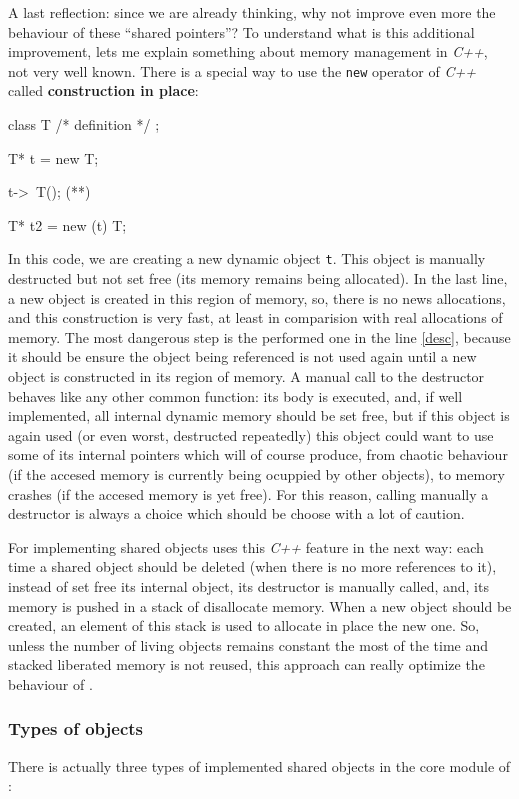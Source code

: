 \documentclass{article}
\begin{document}
A last reflection: since we are already thinking, why not improve even more the
behaviour of these ``shared pointers''? To understand what is this additional
improvement, lets me explain something about memory management in \textit{C++},
not very well known. There is a special way to use the \texttt{new} operator of
\textit{C++} called \textbf{construction in place}:

\begin{Cpp}
  class T { /* definition */ };

  T* t = new T;

  t->~T(); (*\label{desc}*)

  T* t2 = new (t) T;
\end{Cpp}

In this code, we are creating a new dynamic object \texttt{t}. This object is
manually destructed but not set free (its memory remains being allocated). In
the last line, a new object is created in this region of memory, so, there is no
news allocations, and this construction is very fast, at least in comparision
with real allocations of memory. The most dangerous step is the performed one in
the line \ref{desc}, because it should be ensure the object being referenced is
not used again until a new object is constructed in its region of memory. A
manual call to the destructor behaves like any other common function: its
body is executed, and, if well implemented, all internal dynamic memory should
be set free, but if this object is again used (or even worst, destructed
repeatedly) this object could want to use some of its internal pointers which
will of course produce, from chaotic behaviour (if the accesed memory is
currently being ocuppied by other objects), to memory crashes (if the accesed
memory is yet free). For this reason, calling manually a destructor is always a
choice which should be choose with a lot of caution.

For implementing shared objects \fav uses this \textit{C++} feature in the next way:
each time a shared object should be deleted (when there is no more references to
it), instead of set free its internal object, its destructor is manually called,
and, its memory is pushed in a stack of disallocate
memory. When a new object should be created, an element of this stack is used to
allocate in place the new one. So, unless the number of living objects remains
constant the most of the time and stacked liberated memory is not reused, this
approach can really optimize the behaviour of \fav.

\subsubsection{Types of objects}
There is actually three types of implemented shared objects in the core module
of \fav:
\end{document}
